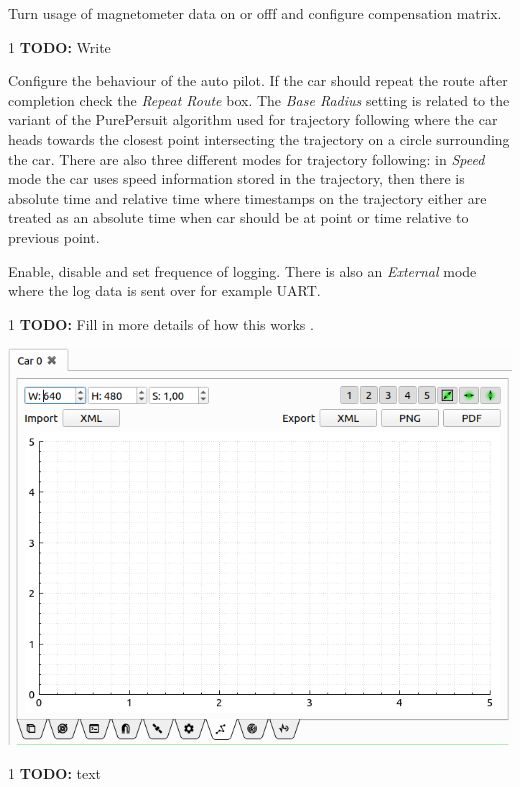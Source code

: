 \documentclass[12pt]{article} %
\def\printtodos{0}
\newcommand{\todo}[1]{
  \if\printtodos1
      {\color{red} \textbf{TODO:} #1}
  \fi}
\begin{document}
\begin{minipage}{0.7\textwidth} %
 Turn usage of magnetometer data on or
offf and configure compensation matrix.

 \todo{ Write }

 Configure the behaviour of the auto
pilot. If the car should repeat the route after completion check the
{\em Repeat Route} box. The {\em Base Radius} setting is related to
the variant of the PurePersuit algorithm used for trajectory following
where the car heads towards the closest point intersecting the
trajectory on a circle surrounding the car. There are also three
different modes for trajectory following: in {\em Speed} mode the car
uses speed information stored in the trajectory, then there is
absolute time and relative time where timestamps on the trajectory
either are treated as an absolute time when car should be at point or
time relative to previous point.

 Enable, disable and set frequence of logging. There is
also an {\em External} mode where the log data is sent over for example UART.
\todo{Fill in more details of how this works}.
\end{minipage}
\noindent\begin{minipage}{0.6\textwidth}
  \noindent \includegraphics[width=\textwidth]{./screens/Car_experiment_plot.png}
\end{minipage}
\begin{minipage}{0.5\textwidth} %
  \todo{text}
\end{minipage}
\end{document}
